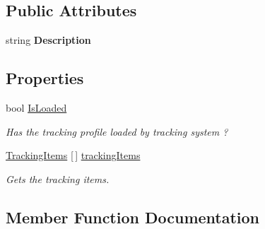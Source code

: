 \subsection*{Public Attributes}
\begin{DoxyCompactItemize}
\item 
\mbox{\label{class_ximmerse_1_1_rhino_x_1_1_object_tracking_profile_a466e497ac9077bf261eb270b5a41f9f1}} 
string {\bfseries Description}
\end{DoxyCompactItemize}
\subsection*{Properties}
\begin{DoxyCompactItemize}
\item 
bool \mbox{\hyperlink{class_ximmerse_1_1_rhino_x_1_1_object_tracking_profile_a3749a2ba2e7a79434c61475897b8d664}{Is\+Loaded}}
\begin{DoxyCompactList}\small\item\em Has the tracking profile loaded by tracking system ? \end{DoxyCompactList}\item 
\mbox{\hyperlink{class_ximmerse_1_1_rhino_x_1_1_object_tracking_profile_1_1_tracking_items}{Tracking\+Items}} \mbox{[}$\,$\mbox{]} \mbox{\hyperlink{class_ximmerse_1_1_rhino_x_1_1_object_tracking_profile_ad9d2e13ef6fdf8e901f7ee53cf42a7d3}{tracking\+Items}}
\begin{DoxyCompactList}\small\item\em Gets the tracking items. \end{DoxyCompactList}\end{DoxyCompactItemize}


\subsection{Member Function Documentation}
\mbox{\label{class_ximmerse_1_1_rhino_x_1_1_object_tracking_profile_a73cba033e2017accd3f607514ccf5935}} 

